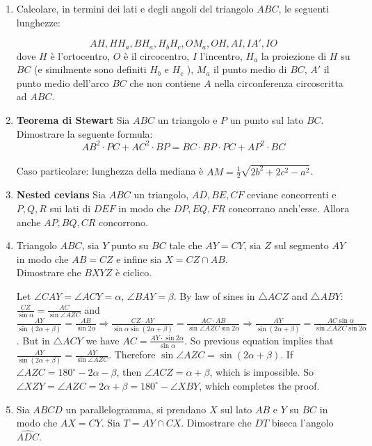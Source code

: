 \begin{enumerate}
\item  Calcolare, in termini dei lati e degli angoli del triangolo $ABC$, le seguenti lunghezze: 

$$AH, HH_a , BH_a , H_bH_c , OM_a , OH, AI, IA' , IO$$
dove $H$ è l’ortocentro, $O$ è il circocentro, $I$ l’incentro, $H_a$ la proiezione di $H$ su $BC$ (e similmente
sono definiti $H_b$ e $H_c$ ), $M_a$ il punto medio di $BC$, $A'$ il punto medio dell’arco $BC$ che non contiene
$A$ nella circonferenza circoscritta ad $ABC$.

\item \textbf{Teorema di Stewart} Sia $ABC$ un triangolo e $P$ un punto sul lato $BC$. Dimostrare la seguente formula: 
$$AB^2\cdot PC + AC^2 \cdot BP = BC \cdot BP \cdot PC + AP^2 \cdot BC$$\\
Caso particolare: lunghezza della mediana è $AM=\frac{1}{2}\sqrt{2b^2+2c^2-a^2}$.

\item \textbf{Nested cevians} Sia $ABC$ un triangolo, $AD,BE,CF$ ceviane concorrenti e $P,Q,R$ sui lati di $DEF$ in modo che $DP,EQ,FR$ concorrano anch'esse. Allora anche $AP,BQ,CR$ concorrono.

\item Triangolo $ABC$, sia $Y$ punto su $BC$ tale che $AY=CY$, sia $Z$ sul segmento $AY$ in modo che $AB=CZ$ e infine sia $X=CZ\cap AB$.\\
Dimostrare che $BXYZ$ è ciclico.\\
\begin{sol}
 Let $\angle CAY = \angle ACY = \alpha$, $\angle BAY = \beta$.
By law of sines in $\triangle ACZ$ and $\triangle ABY$:
$\frac{CZ}{\sin \alpha} = \frac{AC}{\sin \angle AZC}$ and $\frac{AY}{\sin(2\alpha+\beta)} = \frac{AB}{\sin 2\alpha} \Rightarrow \frac{CZ \cdot AY}{\sin \alpha \sin (2\alpha + \beta)} = \frac{AC \cdot AB}{\sin \angle AZC \sin 2\alpha} \Rightarrow \frac{AY}{\sin (2\alpha + \beta)}=\frac{AC \sin \alpha}{\sin \angle AZC \sin 2\alpha}$.
But in $\triangle ACY$ we have $AC = \frac{AY \cdot \sin 2\alpha}{\sin \alpha}$. So previous equation implies that $\frac{AY}{\sin(2\alpha + \beta)} = \frac{AY}{\sin \angle AZC}$.
Therefore $\sin \angle AZC = \sin(2\alpha + \beta)$. If $\angle AZC = 180^{\circ}-2\alpha-\beta$, then $\angle ACZ = \alpha + \beta$, which is impossible. So $\angle XZY = \angle AZC = 2\alpha + \beta = 180^{\circ}-\angle XBY$, which completes the proof.
\end{sol}

\item Sia $ABCD$ un parallelogramma, si prendano $X$ sul lato $AB$ e $Y$ su $BC$ in modo che $AX=CY$. Sia $T=AY\cap CX$. Dimostrare che $DT$ biseca l'angolo $\widehat{ADC}$.\\
\begin{sol}
 

\end{sol}
\end{enumerate}
